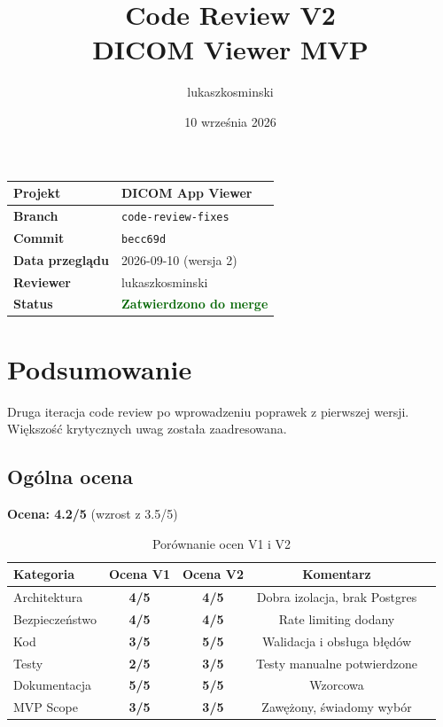 \documentclass[a4paper,12pt]{article}
\title{\textbf{Code Review V2 \\ DICOM Viewer MVP}}
\author{lukaszkosminski}
\date{10 września 2026}
\newcommand{\rating}[1]{\textbf{#1}}
\begin{document}
\maketitle

\begin{center}
\begin{tabularx}{\textwidth}{|l|X|}
\hline
\textbf{Projekt} & DICOM App Viewer \\
\hline
\textbf{Branch} & \texttt{code-review-fixes} \\
\hline
\textbf{Commit} & \texttt{becc69d} \\
\hline
\textbf{Data przeglądu} & 2026-09-10 (wersja 2) \\
\hline
\textbf{Reviewer} & lukaszkosminski \\
\hline
\textbf{Status} & \textcolor{darkgreen}{\textbf{Zatwierdzono do merge}} \\
\hline
\end{tabularx}
\end{center}

\tableofcontents

\section{Podsumowanie}

Druga iteracja code review po wprowadzeniu poprawek z pierwszej wersji. Większość krytycznych uwag została zaadresowana.

\subsection{Ogólna ocena}

\begin{center}
\Large{\textbf{Ocena: 4.2/5 \star}} (wzrost z 3.5/5)
\end{center}

\begin{table}[h!]
\centering
\caption{Porównanie ocen V1 i V2}
\label{tab:oceny}
\begin{tabular}{lcccl}
\toprule
\textbf{Kategoria} & \textbf{Ocena V1} & \textbf{Ocena V2} & \textbf{Komentarz} \\
\midrule
Architektura & \rating{4/5} & \rating{4/5} & Dobra izolacja, brak Postgres \\
Bezpieczeństwo & \rating{4/5} & \rating{4/5} & Rate limiting dodany \\
Kod & \rating{3/5} & \rating{5/5} & Walidacja i obsługa błędów \\
Testy & \rating{2/5} & \rating{3/5} & Testy manualne potwierdzone \\
Dokumentacja & \rating{5/5} & \rating{5/5} & Wzorcowa \\
MVP Scope & \rating{3/5} & \rating{3/5} & Zawężony, świadomy wybór \\
\bottomrule
\end{tabular}
\end{table}
\end{document}
